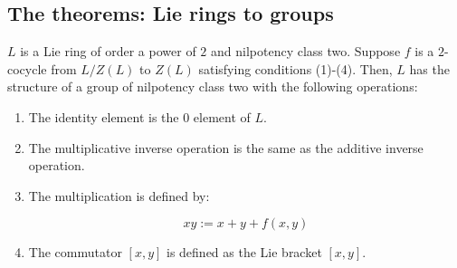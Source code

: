 \documentclass[10pt]{amsart}
\begin{document}
\subsection{The theorems: Lie rings to groups}

\begin{theorem}\label{lazardringtogroup1234}
  $L$ is a Lie ring of order a power of $2$ and nilpotency class
  two. Suppose $f$ is a $2$-cocycle from $L/Z(L)$ to $Z(L)$ satisfying
  conditions (1)-(4). Then, $L$ has the structure of a group of
  nilpotency class two with the following operations:

  \begin{enumerate}
  \item The identity element is the $0$ element of $L$.
  \item The multiplicative inverse operation is the same as the
    additive inverse operation.
  \item The multiplication is defined by:

    $$xy := x + y + f(x,y)$$

  \item The commutator $[x,y]$ is defined as the Lie bracket $[x,y]$.
  \end{enumerate}
\end{theorem}
\end{document}
